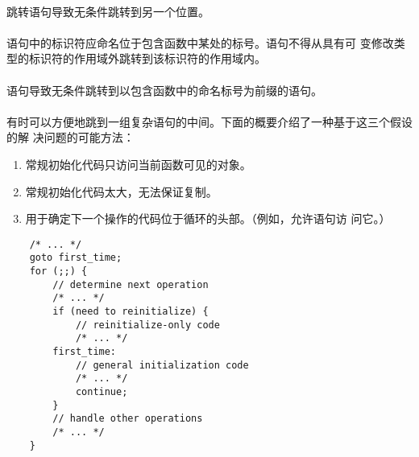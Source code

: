 {                                                 
\syntax
\paragraph{}

\semantic
\paragraph{}
跳转语句导致无条件跳转到另一个位置。

\constraint
\paragraph{}
语句中的标识符应命名位于包含函数中某处的标号。语句不得从具有可
变修改类型的标识符的作用域外跳转到该标识符的作用域内。

\semantic
\paragraph{}
语句导致无条件跳转到以包含函数中的命名标号为前缀的语句。

\paragraph{}
\ex 有时可以方便地跳到一组复杂语句的中间。下面的概要介绍了一种基于这三个假设的解
决问题的可能方法：
\begin{enumerate}
  \item{常规初始化代码只访问当前函数可见的对象。}
  \item{常规初始化代码太大，无法保证复制。}
  \item{用于确定下一个操作的代码位于循环的头部。（例如，允许语句访
    问它。）}
\end{enumerate}
\begin{lstlisting}
    /* ... */
    goto first_time;
    for (;;) {
        // determine next operation
        /* ... */
        if (need to reinitialize) {
            // reinitialize-only code
            /* ... */
        first_time:
            // general initialization code
            /* ... */
            continue;
        }
        // handle other operations
        /* ... */
    }
\end{lstlisting}

}
